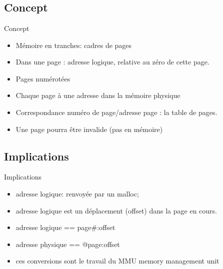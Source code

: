 \section{\sectitle}
\begin{frame}{\sectitle}
\def\subsectitle{Concept}
\subsection{\subsectitle}
\begin{block}{\subsectitle}
\begin{itemize}
    \item Mémoire en tranches: cadres de pages
    \item Dans une page : adresse logique, relative au zéro de cette page.
    \item Pages numérotées
    \item Chaque page à une adresse dans la mémoire physique
    \item Correspondance numéro de page/adresse page : la table de pages.
    \item Une page pourra être invalide (pas en mémoire)
\end{itemize}
\end{block}
\def\subsectitle{Implications}
\subsection{\subsectitle}
\begin{exampleblock}{\subsectitle}
\begin{itemize}
    \item adresse logique: renvoyée par un malloc;
    \item adresse logique est un déplacement (offset) dans la page en cours.
    \item adresse logique == page\#:offset
    \item adresse physique == @page:offset
    \item ces conversions sont le travail du MMU memory management unit
\end{itemize}
\end{exampleblock}
\end{frame}

